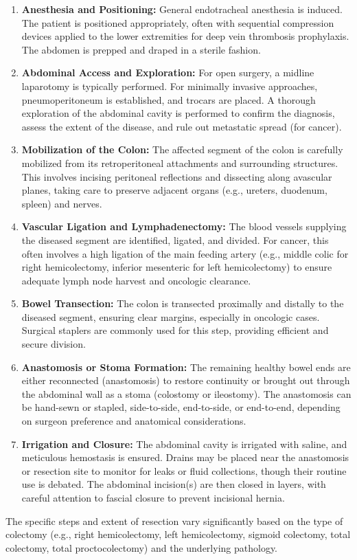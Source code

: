 \begin{enumerate}
  \item \textbf{Anesthesia and Positioning:} General endotracheal anesthesia is induced. The patient is positioned appropriately, often with sequential compression devices applied to the lower extremities for deep vein thrombosis prophylaxis. The abdomen is prepped and draped in a sterile fashion.
  \item \textbf{Abdominal Access and Exploration:} For open surgery, a midline laparotomy is typically performed. For minimally invasive approaches, pneumoperitoneum is established, and trocars are placed. A thorough exploration of the abdominal cavity is performed to confirm the diagnosis, assess the extent of the disease, and rule out metastatic spread (for cancer).
  \item \textbf{Mobilization of the Colon:} The affected segment of the colon is carefully mobilized from its retroperitoneal attachments and surrounding structures. This involves incising peritoneal reflections and dissecting along avascular planes, taking care to preserve adjacent organs (e.g., ureters, duodenum, spleen) and nerves.
  \item \textbf{Vascular Ligation and Lymphadenectomy:} The blood vessels supplying the diseased segment are identified, ligated, and divided. For cancer, this often involves a high ligation of the main feeding artery (e.g., middle colic for right hemicolectomy, inferior mesenteric for left hemicolectomy) to ensure adequate lymph node harvest and oncologic clearance.
  \item \textbf{Bowel Transection:} The colon is transected proximally and distally to the diseased segment, ensuring clear margins, especially in oncologic cases. Surgical staplers are commonly used for this step, providing efficient and secure division.
  \item \textbf{Anastomosis or Stoma Formation:} The remaining healthy bowel ends are either reconnected (anastomosis) to restore continuity or brought out through the abdominal wall as a stoma (colostomy or ileostomy). The anastomosis can be hand-sewn or stapled, side-to-side, end-to-side, or end-to-end, depending on surgeon preference and anatomical considerations.
  \item \textbf{Irrigation and Closure:} The abdominal cavity is irrigated with saline, and meticulous hemostasis is ensured. Drains may be placed near the anastomosis or resection site to monitor for leaks or fluid collections, though their routine use is debated. The abdominal incision(s) are then closed in layers, with careful attention to fascial closure to prevent incisional hernia.
\end{enumerate}
The specific steps and extent of resection vary significantly based on the type of colectomy (e.g., right hemicolectomy, left hemicolectomy, sigmoid colectomy, total colectomy, total proctocolectomy) and the underlying pathology.

